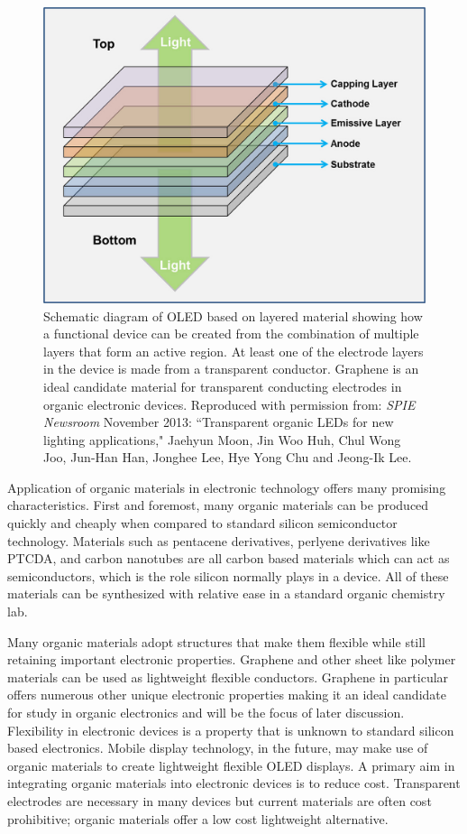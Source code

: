 \begin{figure}
  \centering 
  \includegraphics{figs/oled.jpg}
   \caption{Schematic diagram of OLED based on layered material showing how a functional device can be created from the combination of multiple layers that form an active region. At least one of the electrode layers in the device is made from a transparent conductor. Graphene is an ideal candidate material for transparent conducting electrodes in organic electronic devices. Reproduced with permission from:
\emph{SPIE Newsroom} November 2013: ``Transparent organic LEDs for new lighting applications,"  Jaehyun Moon, Jin Woo Huh, Chul Wong Joo, Jun-Han Han, Jonghee Lee, Hye Yong Chu and Jeong-Ik Lee.}

  \label{oled-fig}
\end{figure}

Application of organic materials in electronic technology offers many promising characteristics. First and foremost, many organic materials can be produced quickly and cheaply when compared to standard silicon semiconductor technology. Materials such as pentacene derivatives, perlyene derivatives like PTCDA, and carbon nanotubes are all carbon based materials which can act as semiconductors, which is the role silicon normally plays in a device. All of these materials can be synthesized with relative ease in a standard organic chemistry lab.

Many organic materials adopt structures that make them flexible while still retaining important electronic properties. Graphene and other sheet like polymer materials can be used as lightweight flexible conductors. Graphene in particular offers numerous other unique electronic properties making it an ideal candidate for study in organic electronics and will be the focus of later discussion. Flexibility in electronic devices is a property that is unknown to standard silicon based electronics. Mobile display technology, in the future, may make use of organic materials to create lightweight flexible OLED displays. A primary aim in integrating organic materials into electronic devices is to reduce cost. Transparent electrodes are necessary in many devices but current materials are often cost prohibitive; organic materials offer a low cost lightweight alternative.


